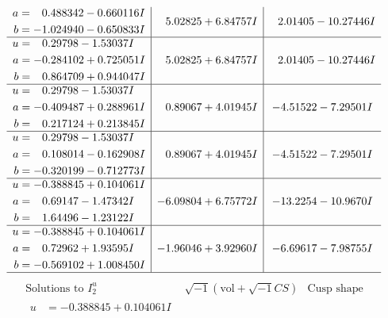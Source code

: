 \documentclass[1p]{elsarticle_modified}
\theoremstyle{definition}
\newcommand{\I}{\sqrt{-1}}
\begin{document}
$$\begin{array}{c|c|c}
\begin{aligned}
a &= \phantom{-}0.488342 - 0.660116 I \\
b &= -1.024940 - 0.650833 I\end{aligned}
 & \phantom{-}5.02825 + 6.84757 I & \phantom{-}2.01405 - 10.27446 I \\ \hline\begin{aligned}
u &= \phantom{-}0.29798 - 1.53037 I \\
a &= -0.284102 + 0.725051 I \\
b &= \phantom{-}0.864709 + 0.944047 I\end{aligned}
 & \phantom{-}5.02825 + 6.84757 I & \phantom{-}2.01405 - 10.27446 I \\ \hline\begin{aligned}
u &= \phantom{-}0.29798 - 1.53037 I \\
a &= -0.409487 + 0.288961 I \\
b &= \phantom{-}0.217124 + 0.213845 I\end{aligned}
 & \phantom{-}0.89067 + 4.01945 I & -4.51522 - 7.29501 I \\ \hline\begin{aligned}
u &= \phantom{-}0.29798 - 1.53037 I \\
a &= \phantom{-}0.108014 - 0.162908 I \\
b &= -0.320199 - 0.712773 I\end{aligned}
 & \phantom{-}0.89067 + 4.01945 I & -4.51522 - 7.29501 I \\ \hline\begin{aligned}
u &= -0.388845 + 0.104061 I \\
a &= \phantom{-}0.69147 - 1.47342 I \\
b &= \phantom{-}1.64496 - 1.23122 I\end{aligned}
 & -6.09804 + 6.75772 I & -13.2254 - 10.9670 I \\ \hline\begin{aligned}
u &= -0.388845 + 0.104061 I \\
a &= \phantom{-}0.72962 + 1.93595 I \\
b &= -0.569102 + 1.008450 I\end{aligned}
 & -1.96046 + 3.92960 I & -6.69617 - 7.98755 I\\
 \hline 
 \end{array}$$\newpage$$\begin{array}{c|c|c}  
\text{Solutions to }I^u_{2}& \I (\text{vol} + \sqrt{-1}CS) & \text{Cusp shape}\\
 \hline 
\begin{aligned}
u &= -0.388845 + 0.104061 I \\

\end{aligned}
\end{array}$$
\end{document}
